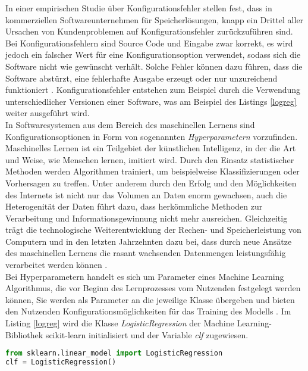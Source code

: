 \documentclass[german,bachelor]{swsLeipzig}
\begin{document}
\indent In einer empirischen Studie über Konfigurationsfehler stellen \citeauthor{10.1145/2043556.2043572} fest,
dass in kommerziellen Softwareunternehmen für Speicherlösungen, knapp ein Drittel aller Ursachen von Kundenproblemen auf Konfigurationsfehler zurückzuführen sind.
Bei Konfigurationsfehlern sind Source Code und Eingabe zwar korrekt, es wird jedoch ein falscher Wert für eine Konfigurationsoption verwendet,
sodass sich die Software nicht wie gewünscht verhält.
Solche Fehler können dazu führen, dass die Software abstürzt, eine fehlerhafte Ausgabe erzeugt oder nur unzureichend funktioniert \cite[]{10.1145/2568225.2568251}.
Konfigurationsfehler entstehen zum Beispiel durch die Verwendung unterschiedlicher Versionen einer Software, was am Beispiel
des Listings \ref{logreg} weiter ausgeführt wird. \\

In Softwaresystemen aus dem Bereich des maschinellen Lernens sind Konfigurationsoptionen in Form von sogenannten \textit{Hyperparametern} vorzufinden.
Maschinelles Lernen ist ein Teilgebiet der künstlichen Intelligenz, in der die Art und Weise, wie Menschen lernen,
imitiert wird.
Durch den Einsatz statistischer Methoden werden Algorithmen trainiert, um beispielweise Klassifizierungen oder Vorhersagen
zu treffen.
Unter anderem durch den Erfolg und den Möglichkeiten des Internets ist nicht nur das Volumen an Daten enorm gewachsen,
auch die Heterogenität der Daten führt dazu, dass herkömmliche Methoden zur Verarbeitung
und Informationsgewinnung nicht mehr ausreichen.
Gleichzeitig trägt die technologische Weiterentwicklung der Rechen- und Speicherleistung von Computern und in den letzten Jahrzehnten dazu bei,
dass durch neue Ansätze des maschinellen Lernens die rasant wachsenden Datenmengen leistungsfähig verarbeitet werden können \cite[]{FRADKOV20201385}.\\
\indent Bei Hyperparametern handelt es sich um Parameter eines Machine Learning Algorithmus, die vor Beginn des Lernprozesses vom Nutzenden festgelegt werden können,
Sie werden als Parameter an die jeweilige Klasse übergeben und bieten den Nutzenden Konfigurationsmöglichkeiten für
das Training des Modells \cite[]{hype}.
Im Listing \ref{logreg} wird die Klasse \textit{LogisticRegression} der Machine Learning-Bibliothek scikit-learn initialisiert
und der Variable \textit{clf} zugewiesen.

\noindent\begin{minipage}{\linewidth}
\begin{lstlisting}[language=Python, frame=single, label = logreg, basicstyle=\small, caption={Nutzung der LogisticRegression-Klasse aus scikit-learn},captionpos=b]
from sklearn.linear_model import LogisticRegression
clf = LogisticRegression()
\end{lstlisting}
\end{minipage}
\
\end{document}
